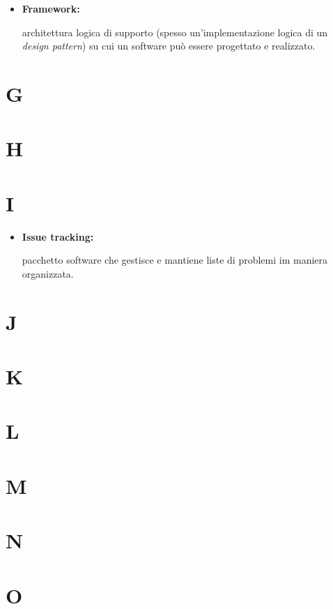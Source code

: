 \begin{itemize}
	\item \hypertarget{fw}{\textbf{Framework:}} architettura logica di supporto (spesso un'implementazione logica di un \textit{design pattern}) su cui un software può essere progettato e realizzato.
\end{itemize}

\section*{G}

\section*{H}

\section*{I}

\begin{itemize}
	\item \hypertarget{it}{\textbf{Issue tracking:}} pacchetto software che gestisce e mantiene liste di problemi im maniera organizzata.
\end{itemize}

\section*{J}

\section*{K}

\section*{L}

\section*{M}

\section*{N}

\section*{O}

